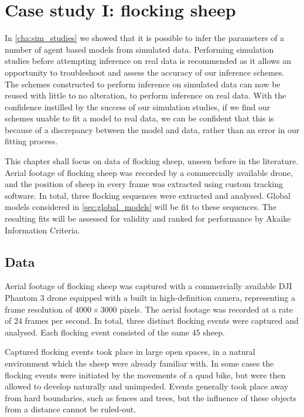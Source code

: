 \graphicspath{{fig/sheep/}}

\chapter{Case study I: flocking sheep}
\label{cha:sheep}

In \cref{cha:sim_studies} we showed that it is possible to infer the parameters
of a number of agent based models from simulated data. Performing simulation
studies before attempting inference on real data is recommended as it allows an
opportunity to troubleshoot and assess the accuracy of our inference schemes.
The schemes constructed to perform inference on simulated data can now be
reused with little to no alteration, to perform inference on real data. With
the confidence instilled by the success of our simulation studies, if we find
our schemes unable to fit a model to real data, we can be confident that this
is because of a discrepancy between the model and data, rather than an error in
our fitting process.

This chapter shall focus on data of flocking sheep, unseen before in the
literature. Aerial footage of flocking sheep was recorded by a commercially
available drone, and the position of sheep in every frame was extracted using
custom tracking software. In total, three flocking sequences were extracted and
analysed. Global models considered in \cref{sec:global_models} will be fit to
these sequences. The resulting fits will be assessed for validity and ranked
for performance by Akaike Information Criteria.

\section{Data}
\label{sec:data}

Aerial footage of flocking sheep was captured with a commercially available DJI
Phantom $3$ drone equipped with a built in high-definition camera, representing
a frame resolution of $4000\times3000$ pixels. The aerial footage was recorded
at a rate of $24$ frames per second. In total, three distinct flocking events
were captured and analysed. Each flocking event consisted of the same $45$
sheep.

Captured flocking events took place in large open spaces, in a natural
environment which the sheep were already familiar with. In some cases the
flocking events were initiated by the movements of a quad bike, but were then
allowed to develop naturally and unimpeded. Events generally took place away
from hard boundaries, such as fences and trees, but the influence of these
objects from a distance cannot be ruled-out.



